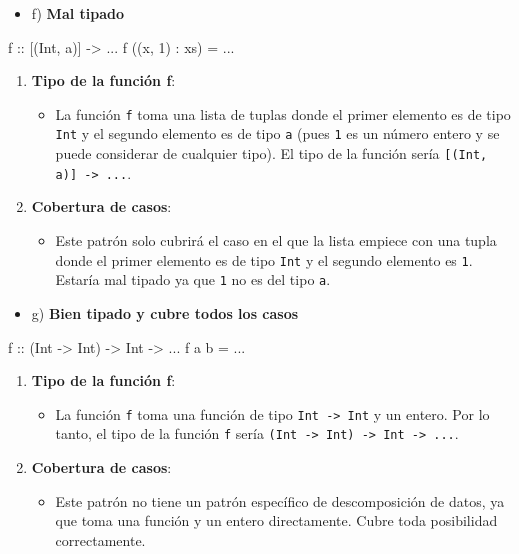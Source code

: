 \documentclass{article}
\begin{document}
        \begin{itemize}
        \item 
            f) \textbf{Mal tipado}
            \end{itemize}
    \begin{haskell}
    f :: [(Int, a)] -> ...
    f ((x, 1) : xs) = ...
    \end{haskell}
            \begin{enumerate}
            \item 
            \textbf{Tipo de la función f}:
            \begin{itemize}
            \item 
            La función \verb|f| toma una lista de tuplas donde el primer elemento es de tipo \verb|Int| y el segundo elemento es de tipo \verb|a| (pues \verb|1| es un número entero y se puede considerar de cualquier tipo). El tipo de la función sería \verb|[(Int, a)] -> ...|.
            \end{itemize}
            \item 
            \textbf{Cobertura de casos}:
            \begin{itemize}
            \item 
            Este patrón solo cubrirá el caso en el que la lista empiece con una tupla donde el primer elemento es de tipo \verb|Int| y el segundo elemento es \verb|1|. Estaría mal tipado ya que \verb|1| no es del tipo \verb|a|.
            \end{itemize}
            \end{enumerate}
    
        \begin{itemize}
            \item 
            g) \textbf{Bien tipado y cubre todos los casos}
            \end{itemize}
    \begin{haskell}
    f :: (Int -> Int) -> Int -> ...
    f a b = ...
    \end{haskell}
                \begin{enumerate}
                \item 
                \textbf{Tipo de la función f}:
                \begin{itemize}
                \item 
                La función \verb|f| toma una función de tipo \verb|Int -> Int| y un entero. Por lo tanto, el tipo de la función \verb|f| sería \verb|(Int -> Int) -> Int -> ...|.
                \end{itemize}
                \item 
                \textbf{Cobertura de casos}:
                \begin{itemize}
                \item 
                Este patrón no tiene un patrón específico de descomposición de datos, ya que toma una función y un entero directamente. Cubre toda posibilidad correctamente.
                \end{itemize}
                \end{enumerate}
                
\end{document}
